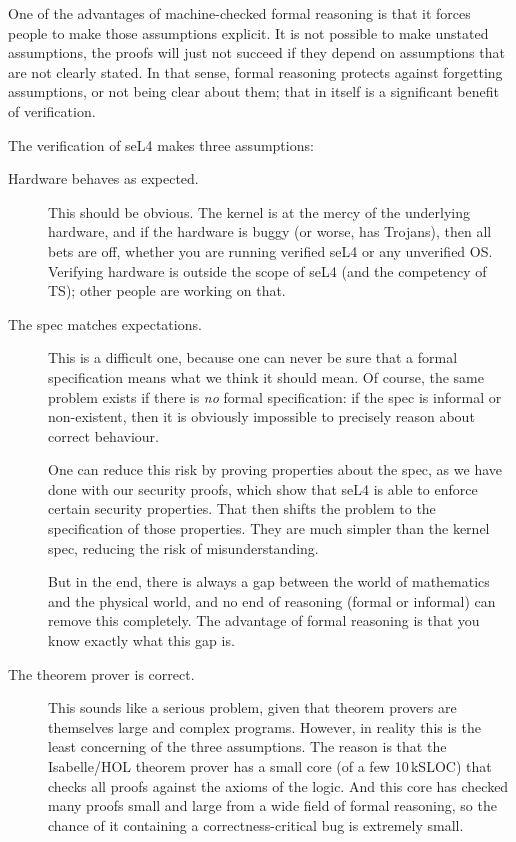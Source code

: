 \documentclass[english,a4paper,12pt\ifDraft,draft\fi]{report}
\begin{document}
  One of the advantages of machine-checked formal reasoning is that it
  forces people to make those assumptions explicit. It is not possible
  to make unstated assumptions, the proofs will just not succeed if
  they depend on assumptions that are not clearly stated. In that
  sense, formal reasoning protects against forgetting assumptions, or
  not being clear about them; that in itself is a significant benefit
  of verification.

  The verification of seL4 makes three assumptions:
  \begin{description}
  \item[Hardware behaves as expected.] This should be obvious. The
    kernel is at the mercy of the underlying hardware, and if the
    hardware is buggy (or worse, has Trojans), then all bets are off,
    whether you are running verified seL4 or any unverified
    OS. Verifying hardware is outside the scope of seL4 (and
    the competency of TS); other people are working on that.
  \item[The spec matches expectations.] This is a difficult one,
    because one can never be sure that a formal specification means
    what we think it should mean. Of course, the same problem exists
    if there is \emph{no} formal specification: if the spec is informal or
    non-existent, then it is obviously impossible to precisely reason
    about correct behaviour.

    One can reduce this risk by proving properties about the spec, as
    we have done with our security proofs, which show that seL4 is
    able to enforce certain security properties. That then shifts the
    problem to the specification of those properties. They are much
    simpler than the kernel spec, reducing the risk of misunderstanding.

    But in the end, there is always a gap between the world of mathematics  and
    the physical world, and no end of reasoning (formal or informal)
    can remove this completely. The advantage of formal reasoning is
    that you know exactly what this gap is.
  \item[The theorem prover is correct.] This sounds like a serious
    problem, given that theorem provers are themselves large and
    complex programs. However, in reality this is the least concerning
    of the three assumptions. The reason is that the Isabelle/HOL
    theorem prover has a small core (of a few 10\,kSLOC) that checks
    all proofs against the axioms of the logic. And this core has
    checked many proofs small and large from a wide field of formal
    reasoning, so the chance of it containing a correctness-critical
    bug is extremely small.
  \end{description}
\end{document}
